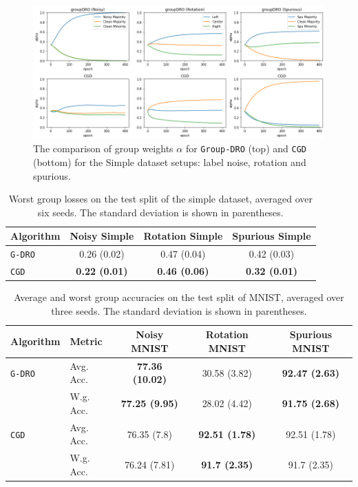 \begin{figure}[H]
    \includegraphics[width=\textwidth]{media/averaged-qualitative-plots-v2.png}
    \centering
    \caption{The comparison of group weights $\alpha$ for \texttt{Group-DRO} (top) and \texttt{CGD} (bottom) for the Simple dataset setups: label noise, rotation and spurious.}
    \label{fig:qualitative_exp}
\end{figure}

\begin{table}[H]
    \centering
    \begin{tabular}{lccc}
        \toprule
        \textbf{Algorithm} & \textbf{Noisy Simple} & \textbf{Rotation Simple} & \textbf{Spurious Simple} \\ 
        \midrule
        \texttt{G-DRO} & 0.26 (0.02) & 0.47 (0.04) & 0.42 (0.03) \\
        \texttt{CGD} & \textbf{0.22 (0.01)}	& \textbf{0.46 (0.06)} & \textbf{0.32 (0.01)} \\
    \bottomrule
    \end{tabular}
    \caption{Worst group losses on the test split of the simple dataset, averaged over six seeds. The standard deviation is shown in parentheses.}
    \label{tab:qual-simple}
\end{table}

\begin{table}[h!]
    \centering
    \begin{tabular}{llccc}
        \toprule
        \textbf{Algorithm} & \textbf{Metric} & \textbf{Noisy MNIST} & \textbf{Rotation MNIST} & \textbf{Spurious MNIST} \\ 
        \midrule
        \texttt{G-DRO} & Avg. Acc. & \textbf{77.36 (10.02)} & 30.58 (3.82) & \textbf{92.47 (2.63)} \\
        & W.g. Acc. & \textbf{77.25 (9.95)} & 28.02 (4.42) & \textbf{91.75 (2.68)} \\
        \texttt{CGD} & Avg. Acc. & 76.35 (7.8) & \textbf{92.51 (1.78)} & 92.51 (1.78) \\
        & W.g. Acc. & 76.24 (7.81) & \textbf{91.7 (2.35)} & 91.7 (2.35) \\
    \bottomrule
    \end{tabular}
    \caption{Average and worst group accuracies on the test split of MNIST, averaged over three seeds. The standard deviation is shown in parentheses.}
    \label{tab:qual-mnist}
\end{table}

